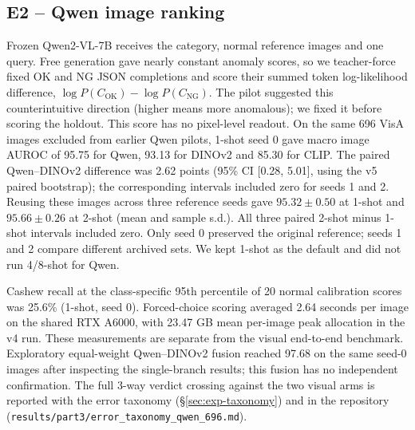 \subsection{E2 -- Qwen image ranking}
\label{sec:exp-qwen}
Frozen Qwen2-VL-7B receives the category, normal reference images and one query.
Free generation gave nearly constant anomaly scores, so we teacher-force fixed OK
and NG JSON completions and score their summed token log-likelihood difference,
$\log P(C_{\mathrm{OK}})-\log P(C_{\mathrm{NG}})$. The pilot suggested this
counterintuitive direction (higher means more anomalous); we fixed it before
scoring the holdout. This score has no pixel-level readout.
On the same 696 VisA images excluded from earlier Qwen pilots, 1-shot seed 0 gave
macro image AUROC of 95.75 for Qwen, 93.13 for DINOv2 and 85.30 for CLIP. The paired
Qwen--DINOv2 difference was 2.62 points (95\% CI [0.28, 5.01], using the v5 paired bootstrap); the corresponding intervals
included zero for seeds 1 and 2. Reusing these images
across three reference seeds gave $95.32\pm0.50$ at 1-shot and $95.66\pm0.26$ at
2-shot (mean and sample s.d.). All three paired 2-shot minus 1-shot intervals included
zero. Only seed 0 preserved the original reference; seeds 1 and 2 compare different
archived sets. We kept 1-shot as the default and did not run 4/8-shot for Qwen.

Cashew recall at the class-specific 95th percentile of 20 normal calibration scores was 25.6\% (1-shot, seed 0).
Forced-choice scoring averaged 2.64 seconds per image on the shared RTX A6000, with
23.47 GB mean per-image peak allocation in the v4 run. These measurements are separate
from the visual end-to-end benchmark. Exploratory equal-weight Qwen--DINOv2 fusion
reached 97.68 on the same seed-0 images after inspecting the single-branch results;
this fusion has no independent confirmation. The full 3-way verdict crossing against the
two visual arms is reported with the error taxonomy (\S\ref{sec:exp-taxonomy}) and in the
repository (\texttt{results/part3/error\_taxonomy\_qwen\_696.md}).
